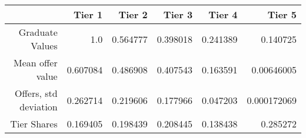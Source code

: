 \begin{tabular}{rrrrrr}
  \hline
   & \textbf{Tier 1} & \textbf{Tier 2} & \textbf{Tier 3} & \textbf{Tier 4} & \textbf{Tier 5} \\\hline
  Graduate Values & 1.0 & 0.564777 & 0.398018 & 0.241389 & 0.140725 \\
  Mean offer value & 0.607084 & 0.486908 & 0.407543 & 0.163591 & 0.00646005 \\
  Offers, std deviation & 0.262714 & 0.219606 & 0.177966 & 0.047203 & 0.000172069 \\
  Tier Shares & 0.169405 & 0.198439 & 0.208445 & 0.138438 & 0.285272 \\\hline
\end{tabular}
